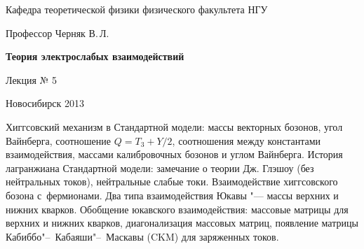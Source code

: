 \documentclass[12pt,pagesize,paper=landscape,paper=192mm:108mm]{scrbook}
\begin{document}
\begin{titlepage}
\begin{center}
    Кафедра теоретической физики физического факультета НГУ
    \medskip

    \Large
    Профессор Черняк В.\,Л.
    \bigskip

    \huge
    \textbf{Теория электрослабых взаимодействий}
    \bigskip

    \Large
    Лекция № 5
    \vfill

    \vfill

\normalsize    Новосибирск 2013
  \smallskip

  \ccbysa
  \end{center}
\end{titlepage}
\newpage

\vspace*{-1em}
\begin{center}
 \vfill
  \begin{minipage}{0.66\linewidth}
    Хиггсовский механизм в Стандартной модели: массы векторных
    бозонов, угол Вайнберга, соотношение $Q=T_3+Y/2$, соотношения
    между константами взаимодействия, массами калибровочных бозонов и
    углом Вайнберга.  История лагранжиана Стандартной модели:
    замечание о теории Дж. Глэшоу (без нейтральных токов), нейтральные
    слабые токи.  Взаимодействие хиггсовского бозона с~фермионами. Два
    типа взаимодействия Юкавы "--- массы верхних и нижних
    кварков. Обобщение юкавского взаимодействия: массовые матрицы для
    верхних и нижних кварков, диагонализация массовых матриц,
    появление матрицы Кабиббо"--~Кабаяши"--~Маскавы (CKM) для заряженных
    токов.
  \end{minipage}
  \vfill

\end{center}
\end{document}
